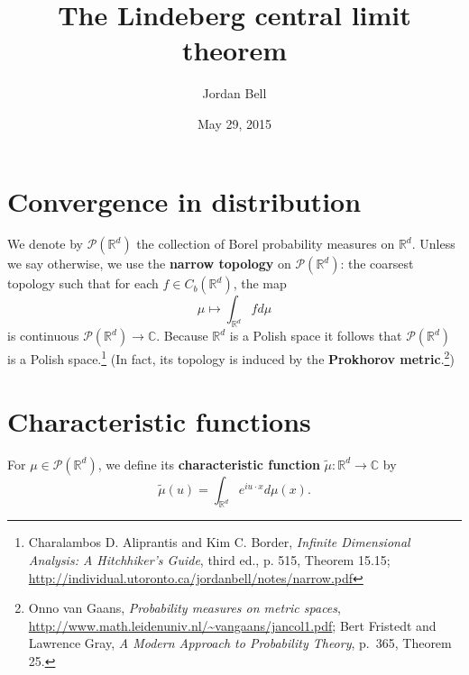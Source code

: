 \documentclass{article}
\theoremstyle{definition}
\begin{document}
\title{The  Lindeberg central limit theorem}
\author{Jordan Bell}
\date{May 29, 2015}

\maketitle


\section{Convergence in distribution}
We denote by $\mathscr{P}(\mathbb{R}^d)$ the collection of Borel probability measures on $\mathbb{R}^d$.
Unless we say otherwise, we use the \textbf{narrow topology} on $\mathscr{P}(\mathbb{R}^d)$: the coarsest
topology such that for each $f \in C_b(\mathbb{R}^d)$, the map
\[
\mu \mapsto \int_{\mathbb{R}^d} f d\mu
\]
is continuous $\mathscr{P}(\mathbb{R}^d) \to \mathbb{C}$. 
Because $\mathbb{R}^d$ is a Polish space it follows that $\mathscr{P}(\mathbb{R}^d)$ is a Polish space.\footnote{Charalambos D. Aliprantis and Kim C. Border, {\em Infinite Dimensional Analysis: A Hitchhiker's
Guide}, third ed., p. 515, Theorem 15.15; \url{http://individual.utoronto.ca/jordanbell/notes/narrow.pdf}}
(In fact, its topology is induced by the \textbf{Prokhorov metric}.\footnote{Onno van Gaans, 
{\em Probability measures on metric spaces}, \url{http://www.math.leidenuniv.nl/~vangaans/jancol1.pdf};
Bert Fristedt and Lawrence Gray, {\em A Modern Approach to Probability Theory}, p.~365, Theorem 25.})



\section{Characteristic functions}
For $\mu \in \mathscr{P}(\mathbb{R}^d)$, we define its \textbf{characteristic function}
$\tilde{\mu}:\mathbb{R}^d \to \mathbb{C}$ by
\[
\tilde{\mu}(u) = \int_{\mathbb{R}^d} e^{iu\cdot x} d\mu(x).
\]
\end{document}
